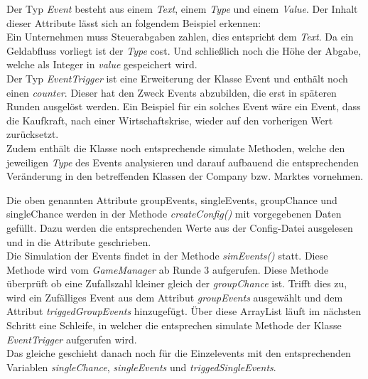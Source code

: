 Der Typ \textit{Event} besteht aus einem \textit{Text}, einem \textit{Type} und einem \textit{Value}. Der Inhalt dieser Attribute lässt sich an folgendem Beispiel erkennen:\\
Ein Unternehmen muss Steuerabgaben zahlen, dies entspricht dem \textit{Text}. Da ein Geldabfluss vorliegt ist der \textit{Type} cost. Und schließlich noch die Höhe der Abgabe, welche als Integer in \textit{value} gespeichert wird.\\

Der Typ \textit{EventTrigger} ist eine Erweiterung der Klasse Event und enthält noch einen \textit{counter}. Dieser hat den Zweck Events abzubilden, die erst in späteren Runden ausgelöst werden. Ein Beispiel für ein solches Event wäre ein Event, dass die Kaufkraft, nach einer Wirtschaftskrise, wieder auf den vorherigen Wert zurücksetzt. \\
 Zudem enthält die Klasse noch entsprechende simulate Methoden, welche den jeweiligen \textit{Type} des Events analysieren und darauf aufbauend die entsprechenden Veränderung in den betreffenden Klassen der Company bzw. Marktes vornehmen.

Die oben genannten Attribute groupEvents, singleEvents, groupChance und singleChance werden in der Methode \textit{createConfig()} mit vorgegebenen Daten gefüllt. Dazu werden die entsprechenden Werte aus der Config-Datei ausgelesen und in die Attribute geschrieben.\\
Die Simulation der Events findet in der Methode \textit{simEvents()} statt. Diese Methode wird vom \textit{GameManager} ab Runde 3 aufgerufen. Diese Methode überprüft ob eine Zufallszahl kleiner gleich der \textit{groupChance} ist. Trifft dies zu, wird ein Zufälliges Event aus dem Attribut \textit{groupEvents}  ausgewählt und dem Attribut \textit{triggedGroupEvents} hinzugefügt. Über diese ArrayList läuft im nächsten Schritt eine Schleife, in welcher die entsprechen simulate Methode der Klasse \textit{EventTrigger} aufgerufen wird.\\
Das gleiche geschieht danach noch für die Einzelevents mit den entsprechenden Variablen \textit{singleChance}, \textit{singleEvents} und \textit{triggedSingleEvents}.


